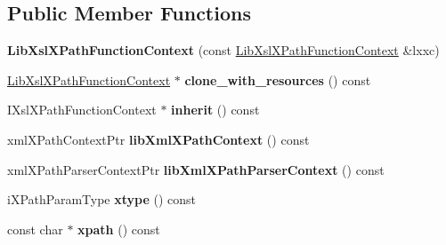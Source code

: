 \subsection*{\-Public \-Member \-Functions}
\begin{DoxyCompactItemize}
\item 
\hypertarget{classgeneral__server_1_1LibXslXPathFunctionContext_aa6b832394899ae65aed5ae8caee3524c}{{\bfseries \-Lib\-Xsl\-X\-Path\-Function\-Context} (const \hyperlink{classgeneral__server_1_1LibXslXPathFunctionContext}{\-Lib\-Xsl\-X\-Path\-Function\-Context} \&lxxc)}\label{classgeneral__server_1_1LibXslXPathFunctionContext_aa6b832394899ae65aed5ae8caee3524c}

\item 
\hypertarget{classgeneral__server_1_1LibXslXPathFunctionContext_a3045533a8e42a8453b9cbb70807a50dd}{\hyperlink{classgeneral__server_1_1LibXslXPathFunctionContext}{\-Lib\-Xsl\-X\-Path\-Function\-Context} $\ast$ {\bfseries clone\-\_\-with\-\_\-resources} () const }\label{classgeneral__server_1_1LibXslXPathFunctionContext_a3045533a8e42a8453b9cbb70807a50dd}

\item 
\hypertarget{classgeneral__server_1_1LibXslXPathFunctionContext_adac4174e9e5b91f772a0a03fa0c33cfc}{\-I\-Xsl\-X\-Path\-Function\-Context $\ast$ {\bfseries inherit} () const }\label{classgeneral__server_1_1LibXslXPathFunctionContext_adac4174e9e5b91f772a0a03fa0c33cfc}

\item 
\hypertarget{classgeneral__server_1_1LibXslXPathFunctionContext_a1d0f2d9f30e06aadfdd7e78b94cc3560}{xml\-X\-Path\-Context\-Ptr {\bfseries lib\-Xml\-X\-Path\-Context} () const }\label{classgeneral__server_1_1LibXslXPathFunctionContext_a1d0f2d9f30e06aadfdd7e78b94cc3560}

\item 
\hypertarget{classgeneral__server_1_1LibXslXPathFunctionContext_a1753d3193596f9b278e00c8e104e88ae}{xml\-X\-Path\-Parser\-Context\-Ptr {\bfseries lib\-Xml\-X\-Path\-Parser\-Context} () const }\label{classgeneral__server_1_1LibXslXPathFunctionContext_a1753d3193596f9b278e00c8e104e88ae}

\item 
\hypertarget{classgeneral__server_1_1LibXslXPathFunctionContext_a1334de8ae436b902094d858e1397114c}{i\-X\-Path\-Param\-Type {\bfseries xtype} () const }\label{classgeneral__server_1_1LibXslXPathFunctionContext_a1334de8ae436b902094d858e1397114c}

\item 
\hypertarget{classgeneral__server_1_1LibXslXPathFunctionContext_a1e2dad4499e6f1a1cc20f80fb6c7c914}{const char $\ast$ {\bfseries xpath} () const }\label{classgeneral__server_1_1LibXslXPathFunctionContext_a1e2dad4499e6f1a1cc20f80fb6c7c914}


\end{DoxyCompactItemize}
